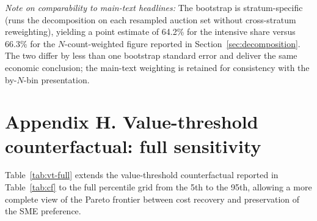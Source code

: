 \documentclass[12pt]{article}
\begin{document}
\emph{Note on comparability to main-text headlines:} The
bootstrap is stratum-specific (runs the decomposition on each
resampled auction set without cross-stratum reweighting),
yielding a point estimate of 64.2\% for the intensive share
versus 66.3\% for the $N$-count-weighted figure reported in
Section~\ref{sec:decomposition}. The two differ by less than one
bootstrap standard error and deliver the same economic
conclusion; the main-text weighting is retained for consistency
with the by-$N$-bin presentation.

\section*{Appendix H. Value-threshold counterfactual: full sensitivity}
\label{app:vt-full}

Table~\ref{tab:vt-full} extends the value-threshold counterfactual
reported in Table~\ref{tab:cf} to the full percentile grid from
the 5th to the 95th, allowing a more complete view of the Pareto
frontier between cost recovery and preservation of the SME
preference.
\end{document}
